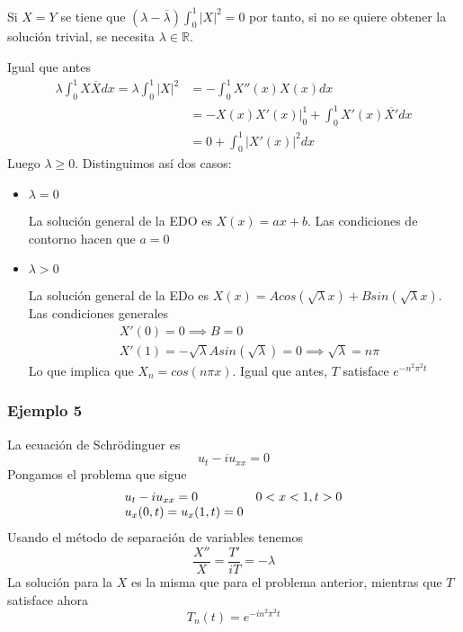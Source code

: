 Si $X=Y$ se tiene que
$(\lambda - \overline{\lambda})\int_0^1|X|^2 = 0$
por tanto, si no se quiere obtener la solución trivial, se necesita $\lambda\in\mathbb{R}$.

\noindent Igual que antes
\begin{align*}
\lambda \int_0^1X\overline{X}dx = \lambda \int_0^1 |X|^2 & = -\int_0^1X''(x)X(x)dx\\
	& = \left.-X(x)X'(x)\right|_0^1 + \int_0^1X'(x)\overline{X'}dx\\
	& = 0 + \int_0^1|X'(x)|^2dx
\end{align*}
Luego $\lambda \ge 0$. Distinguimos así dos casos:

\begin{itemize}
\item $\lambda = 0$

La solución general de la EDO es $X(x) = ax+b$. Las condiciones de contorno hacen que $a=0$

\item $\lambda > 0$

La solución general de la EDo es $X(x) = Acos(\sqrt{\lambda}x)+Bsin(\sqrt{\lambda}x)$. 
Las condiciones generales
\begin{align*}
& X'(0) = 0 \implies B = 0\\
& X'(1) = -\sqrt{\lambda}Asin(\sqrt{\lambda})=0\implies \sqrt{\lambda}=n\pi
\end{align*}
Lo que implica que $X_n=cos(n\pi x)$.
Igual que antes, $T$ satisface $e^{-n^2\pi^2t}$
\end{itemize}

\subsubsection*{Ejemplo 5}
La ecuación de Schrödinguer es
$$u_t-iu_{xx}=0$$
Pongamos el problema que sigue
\begin{equation*}
\begin{array}{l l}
u_t-iu_{xx}=0 & 0<x<1, t>0\\
u_x(0,t)=u_x(1,t) = 0 & 
\end{array}
\end{equation*}
Usando el método de separación de variables tenemos
$$\frac{X''}{X}=\frac{T'}{iT}=-\lambda$$
La solución para la $X$ es la misma que para el problema anterior, mientras que $T$ satisface ahora
$$T_n(t) = e^{-in^2\pi^2t}$$

